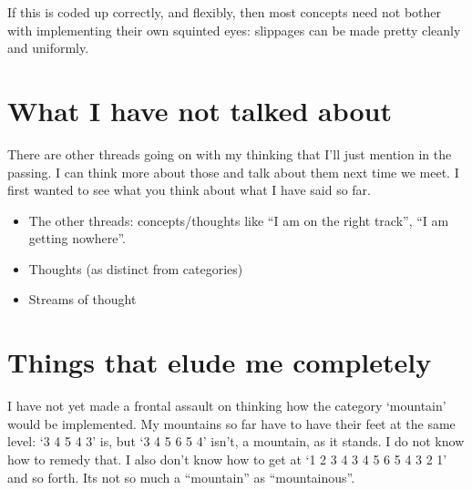 \documentclass{article}
\begin{document}
If this is coded up correctly, and flexibly, then most concepts need not bother with implementing their own squinted eyes: slippages can be made pretty cleanly and uniformly.

\section*{What I have not talked about}

There are other threads going on with my thinking that I'll just mention in the passing. I can think more about those and talk about them next time we meet. I first wanted to see what you think about what I have said so far.
\begin{itemize}
\item The other threads: concepts/thoughts like ``I am on the right track'', ``I am getting nowhere''.
\item Thoughts (as distinct from categories)
\item Streams of thought

\end{itemize}

\section*{Things that elude me completely}

I have not yet made a frontal assault on thinking how the category `mountain' would be implemented. My mountains so far have to have their feet at the same level: `3 4 5 4 3' is, but `3 4 5 6 5 4' isn't, a mountain, as it stands. I do not know how to remedy that. I also don't know how to get at `1 2 3 4 3 4 5 6 5 4 3 2 1' and so forth. Its not so much a ``mountain'' as ``mountainous''.
\end{document}
